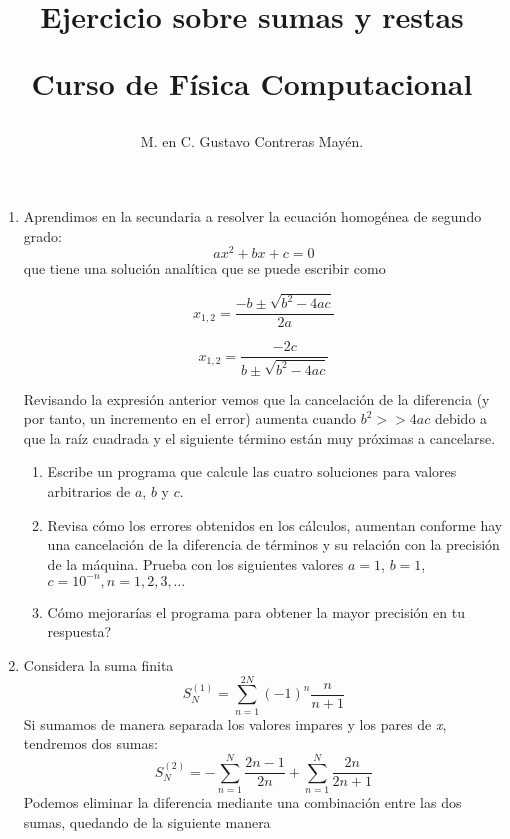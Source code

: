 \documentclass[12pt]{article}
\author{M. en C. Gustavo Contreras Mayén.}
\title{Ejercicio sobre sumas y restas \\
\begin{large}Curso de Física Computacional\end{large}}
\date{ }
\begin{document}
\maketitle
\fontsize{14}{14}\selectfont
\begin{enumerate}
\item Aprendimos en la secundaria a resolver la ecuaci\'{o}n homog\'{e}nea de segundo grado:
\[ ax^{2} + bx + c = 0\]
que tiene una soluci\'{o}n anal\'{i}tica que se puede escribir como
\\
\begin{center}
\begin{minipage}{5cm}
\[ x_{1,2} = \dfrac{-b \pm \sqrt{b^{2} - 4ac}}{2a}\]
\end{minipage}
\hspace{0.5cm}
\begin{minipage}{5cm}
\[ x_{1,2} = \dfrac{-2c}{b \pm \sqrt{b^{2}-4ac}}\]
\end{minipage}
\end{center}
Revisando la expresi\'{o}n anterior vemos que la cancelaci\'{o}n de la diferencia (y por tanto, un incremento en el error) aumenta cuando $b^{2} >> 4ac$ debido a que la ra\'{i}z cuadrada y el siguiente t\'{e}rmino est\'{a}n muy pr\'{o}ximas a cancelarse.
\begin{enumerate}
\item Escribe un programa que calcule las cuatro soluciones para valores arbitrarios de $a$, $b$ y $c$.
\item Revisa c\'{o}mo los errores obtenidos en los c\'{a}lculos, aumentan conforme hay una cancelaci\'{o}n de la diferencia de t\'{e}rminos y su relaci\'{o}n con la precisi\'{o}n de la m\'{a}quina. Prueba con los siguientes valores $a=1$, $b=1$, $c=10^{-n}, n=1,2,3,\ldots$
\item C\'{o}mo mejorar\'{i}as el programa para obtener la mayor precisi\'{o}n en tu respuesta?
\end{enumerate}
\item Considera la suma finita
\begin{equation}
S^{(1)}_{N}= \sum^{2N}_{n=1} (-1)^{n} \dfrac{n}{n+1}
\end{equation}
Si sumamos de manera separada los valores impares y los pares de \textit{x}, tendremos dos sumas:
\begin{equation}
S^{(2)}_{N}= - \sum^{N}_{n=1} \dfrac{2n-1}{2n} + \sum^{N}_{n=1} \dfrac{2n}{2n+1}
\end{equation}
Podemos eliminar la diferencia mediante una combinación entre las dos sumas, quedando de la siguiente manera

\end{enumerate}
\end{document}
